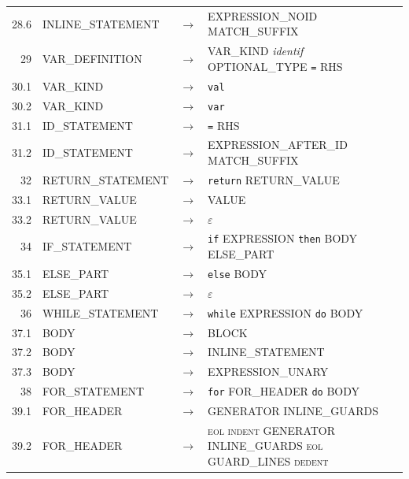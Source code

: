 \documentclass[11pt,a4paper]{article}
\begin{document}
{\begin{longtable}{r l c >{\raggedright\arraybackslash}p{6.6cm} >{\raggedright\arraybackslash}p{3.2cm}}
28.6 & \textsf{INLINE\_STATEMENT} & $\rightarrow$ & \textsf{EXPRESSION\_NOID} \textsf{MATCH\_SUFFIX} & {\scriptsize } \\
29 & \textsf{VAR\_DEFINITION} & $\rightarrow$ & \textsf{VAR\_KIND} \textit{identif} \textsf{OPTIONAL\_TYPE} \texttt{=} \textsf{RHS} & {\scriptsize } \\
30.1 & \textsf{VAR\_KIND} & $\rightarrow$ & \texttt{val} & {\scriptsize } \\
30.2 & \textsf{VAR\_KIND} & $\rightarrow$ & \texttt{var} & {\scriptsize } \\
31.1 & \textsf{ID\_STATEMENT} & $\rightarrow$ & \texttt{=} \textsf{RHS} & {\scriptsize } \\
31.2 & \textsf{ID\_STATEMENT} & $\rightarrow$ & \textsf{EXPRESSION\_AFTER\_ID} \textsf{MATCH\_SUFFIX} & {\scriptsize } \\
32 & \textsf{RETURN\_STATEMENT} & $\rightarrow$ & \texttt{return} \textsf{RETURN\_VALUE} & {\scriptsize } \\
33.1 & \textsf{RETURN\_VALUE} & $\rightarrow$ & \textsf{VALUE} & {\scriptsize } \\
33.2 & \textsf{RETURN\_VALUE} & $\rightarrow$ & $\varepsilon$ & {\scriptsize } \\
34 & \textsf{IF\_STATEMENT} & $\rightarrow$ & \texttt{if} \textsf{EXPRESSION} \texttt{then} \textsf{BODY} \textsf{ELSE\_PART} & {\scriptsize } \\
35.1 & \textsf{ELSE\_PART} & $\rightarrow$ & \texttt{else} \textsf{BODY} & {\scriptsize } \\
35.2 & \textsf{ELSE\_PART} & $\rightarrow$ & $\varepsilon$ & {\scriptsize } \\
36 & \textsf{WHILE\_STATEMENT} & $\rightarrow$ & \texttt{while} \textsf{EXPRESSION} \texttt{do} \textsf{BODY} & {\scriptsize } \\
37.1 & \textsf{BODY} & $\rightarrow$ & \textsf{BLOCK} & {\scriptsize } \\
37.2 & \textsf{BODY} & $\rightarrow$ & \textsf{INLINE\_STATEMENT} & {\scriptsize } \\
37.3 & \textsf{BODY} & $\rightarrow$ & \textsf{EXPRESSION\_UNARY} & {\scriptsize } \\
38 & \textsf{FOR\_STATEMENT} & $\rightarrow$ & \texttt{for} \textsf{FOR\_HEADER} \texttt{do} \textsf{BODY} & {\scriptsize } \\
39.1 & \textsf{FOR\_HEADER} & $\rightarrow$ & \textsf{GENERATOR} \textsf{INLINE\_GUARDS} & {\scriptsize } \\
39.2 & \textsf{FOR\_HEADER} & $\rightarrow$ & \textsc{eol} \textsc{indent} \textsf{GENERATOR} \textsf{INLINE\_GUARDS} \textsc{eol} \textsf{GUARD\_LINES} \textsc{dedent} & {\scriptsize } \\

\end{longtable}}
\end{document}
